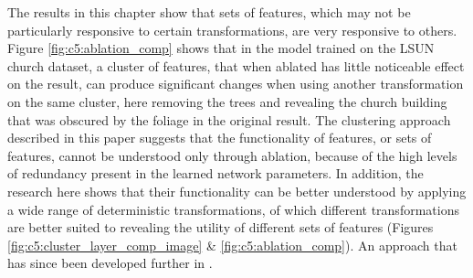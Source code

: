 The results in this chapter show that sets of features, which may not be particularly responsive to certain transformations, are very responsive to others. 
Figure \ref{fig:c5:ablation_comp} shows that in the model trained on the LSUN church dataset, a cluster of features, that when ablated has little noticeable effect on the result, can produce significant changes when using another transformation on the same cluster, here removing the trees and revealing the church building that was obscured by the foliage in the original result. 
The clustering approach described in this paper suggests that the functionality of features, or sets of features, cannot be understood only through ablation, because of the high levels of redundancy present in the learned network parameters. 
In addition, the research here shows that their functionality can be better understood by applying a wide range of deterministic transformations, of which different transformations are better suited to revealing the utility of different sets of features (Figures \ref{fig:c5:cluster_layer_comp_image} \& \ref{fig:c5:ablation_comp}). 
An approach that has since been developed further in \citep{oldfield2022panda,oldfield2024bilinear}.

